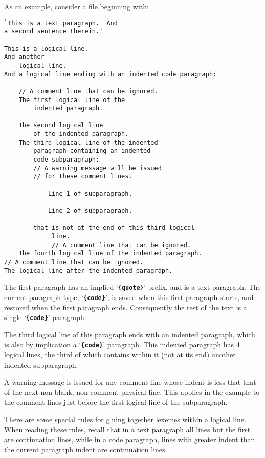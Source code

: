 \documentclass[12pt]{article}
\newcommand{\TT}[1]{{\tt \bfseries #1}}
\newenvironment{indpar}[1][0.3in]%
	{\begin{list}{}%
		     {\setlength{\itemsep}{0in}%
		      \setlength{\topsep}{0in}%
		      \setlength{\parsep}{1ex}%
		      \setlength{\labelwidth}{#1}%
		      \setlength{\leftmargin}{#1}%
		      \addtolength{\leftmargin}{\labelsep}}%
	 \item}%
	{\end{list}}
\begin{document}
As an example, consider a file beginning with:

\begin{indpar}\begin{verbatim}
`This is a text paragraph.  And
a second sentence therein.'

This is a logical line.
And another
    logical line.
And a logical line ending with an indented code paragraph:

    // A comment line that can be ignored.
    The first logical line of the
        indented paragraph.

    The second logical line
        of the indented paragraph.
    The third logical line of the indented
        paragraph containing an indented
        code subparagraph:
        // A warning message will be issued
        // for these comment lines.

            Line 1 of subparagraph.

            Line 2 of subparagraph.

        that is not at the end of this third logical
             line.
             // A comment line that can be ignored.
    The fourth logical line of the indented paragraph.
// A comment line that can be ignored.
The logical line after the indented paragraph.
\end{verbatim}\end{indpar}

The first paragraph has an implied `\TT{\{quote\}}' prefix, and
is a text paragraph.  The current paragraph type, `\TT{\{code\}}',
is saved when this first paragraph starts, and restored when
the first paragraph ends.  Consequently the rest of the text is
a single `\TT{\{code\}}' paragraph.

The third logical line of this paragraph ends with an indented paragraph,
which is also by implication a `\TT{\{code\}}' paragraph.
This indented paragraph has 4 logical lines, the third of which
contains within it (not at its end) another indented subparagraph.

A warning message is issued for any comment line whose indent is
less that that of the next non-blank, non-comment physical line.
This applies in the example to the comment lines just before the
first logical line of the subparagraph.

There are some special rules for gluing together lexemes within
a logical line.  When reading these rules, recall that in a text
paragraph all lines but the first are continuation lines, while
in a code paragraph, lines with greater indent than the current paragraph
indent are continuation lines.
\end{document}
